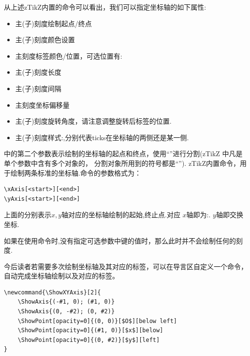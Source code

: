 从上述zTikZ内置的\cmd{\xAxis}\index{\cmd{\xAxis}}命令可以看出，我们可以指定坐标轴的如下属性:
\begin{itemize}
    \item 主(子)刻度绘制起点/终点
    \item 主(子)刻度颜色设置
    \item 主刻度标签颜色/位置，可选位置有:
    \item 主(子)刻度长度
    \item 主(子)刻度间隔
    \item 主刻度坐标偏移量
    \item 主(子)刻度旋转角度，请注意调整旋转后标签的位置.
    \item 主(子)刻度样式:,分别代表ticks在坐标轴的两侧还是某一侧.
\end{itemize}

\cmd{\ShowAxis}中的第二个参数表示绘制的坐标轴的起点和终点，使用``\cmd{;}''进行分割(zTikZ 中凡是单个参数中含有多个对象的，
分割对象所用到的符号都是``\cmd{;}''). zTikZ内置\cmd{\xAxis,\yAxis}\index{\cmd{\yAxis}}命令，用于绘制两条标准的坐标轴.命令的参数格式为：
\begin{verbatim}
\xAxis[<start>][<end>]
\yAxis[<start>][<end>]
\end{verbatim}

上面的分别表示$x,y$轴对应的坐标轴绘制的起始,终止点.对应 $x$轴即为:.
$y$轴即交换坐标.

\begin{remark}
    如果在使用\cmd{\ShowAxis}命令时,没有指定可选参数中键的值时，那么此时并不会绘制任何的刻度.
\end{remark}

今后读者若需要多次绘制坐标轴及其对应的标签，可以在导言区自定义一个\cmd{\ShowXYAxis}命令，
自动完成坐标轴绘制以及对应的标签。
\newcommand{\ShowXYAxis}[2]{
    \ShowAxis{(-#1, 0); (#1, 0)}
    \ShowAxis{(0, -#2); (0, #2)}
    \ShowPoint[opacity=0]{(0, 0)}[$O$][below left]
    \ShowPoint[opacity=0]{(#1, 0)}[$x$][below]
    \ShowPoint[opacity=0]{(0, #2)}[$y$][left]
}

\begin{verbatim}
\newcommand{\ShowXYAxis}[2]{
    \ShowAxis{(-#1, 0); (#1, 0)}
    \ShowAxis{(0, -#2); (0, #2)}
    \ShowPoint[opacity=0]{(0, 0)}[$O$][below left]
    \ShowPoint[opacity=0]{(#1, 0)}[$x$][below]
    \ShowPoint[opacity=0]{(0, #2)}[$y$][left]
}
\end{verbatim}

